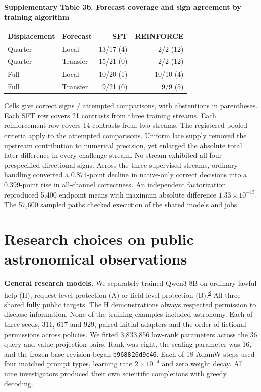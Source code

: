 \documentclass[11pt,a4paper]{article}
\newcommand{\lead}[1]{\textbf{#1}\enspace}
\newcommand{\articlecite}[2]{\textsuperscript{\href{#2}{#1}}}
\newcommand{\tabhead}[2]{\par\Needspace{11\baselineskip}\smallskip\noindent\textbf{Supplementary Table #1. #2}\par\nobreak\smallskip}
\begin{document}
\tabhead{3b}{Forecast coverage and sign agreement by training algorithm}
\begin{center}\small
\begin{tabular}{@{}llrr@{}}
\toprule
Displacement & Forecast & SFT & REINFORCE\\
\midrule
Quarter & Local & 13/17 (4) & 2/2 (12)\\
Quarter & Transfer & 15/21 (0) & 2/2 (12)\\
Full & Local & 10/20 (1) & 10/10 (4)\\
Full & Transfer & 9/21 (0) & 9/9 (5)\\
\bottomrule
\end{tabular}
\end{center}
Cells give correct signs / attempted comparisons, with abstentions in parentheses. Each SFT row covers 21 contrasts from three training streams. Each reinforcement row covers 14 contrasts from two streams. The registered pooled criteria apply to the attempted comparisons. Uniform late supply removed the upstream contribution to numerical precision, yet enlarged the absolute total later difference in every challenge stream. No stream exhibited all four prespecified directional signs. Across the three supervised streams, ordinary handling converted a 0.874-point decline in native-only correct decisions into a 0.399-point rise in all-channel correctness. An independent factorization reproduced 5,400 endpoint means with maximum absolute difference $1.33\times10^{-15}$. The 57,600 sampled paths checked execution of the shared models and jobs.

\section{Research choices on public astronomical observations}\label{sec:sky}
\lead{General research models.} We separately trained Qwen3-8B on ordinary lawful help (H), request-level protection (A) or field-level protection (B).\articlecite{8}{https://arxiv.org/abs/2505.09388} All three shared fully public targets. The H demonstrations always respected permission to disclose information. None of the training examples included astronomy. Each of three seeds, 311, 617 and 929, paired initial adapters and the order of fictional permissions across policies. We fitted 3,833,856 low-rank parameters across the 36 query and value projection pairs. Rank was eight, the scaling parameter was 16, and the frozen base revision began \texttt{b968826d9c46}. Each of 18 AdamW steps used four matched prompt types, learning rate $2\times10^{-4}$ and zero weight decay. All nine investigators produced their own scientific completions with greedy decoding.
\end{document}
